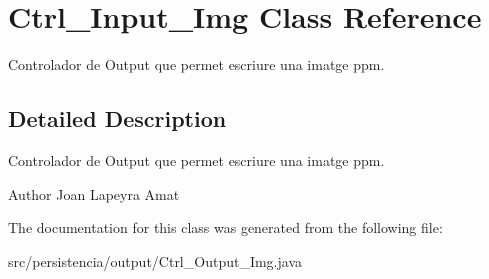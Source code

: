 \hypertarget{classCtrl__Input__Img}{}\section{Ctrl\+\_\+\+Input\+\_\+\+Img Class Reference}
\label{classCtrl__Input__Img}


Controlador de Output que permet escriure una imatge ppm.  




\subsection{Detailed Description}
Controlador de Output que permet escriure una imatge ppm. 

\begin{DoxyAuthor}{Author}
Joan Lapeyra Amat 
\end{DoxyAuthor}


The documentation for this class was generated from the following file\+:\begin{DoxyCompactItemize}
\item 
src/persistencia/output/Ctrl\+\_\+\+Output\+\_\+\+Img.\+java\end{DoxyCompactItemize}
